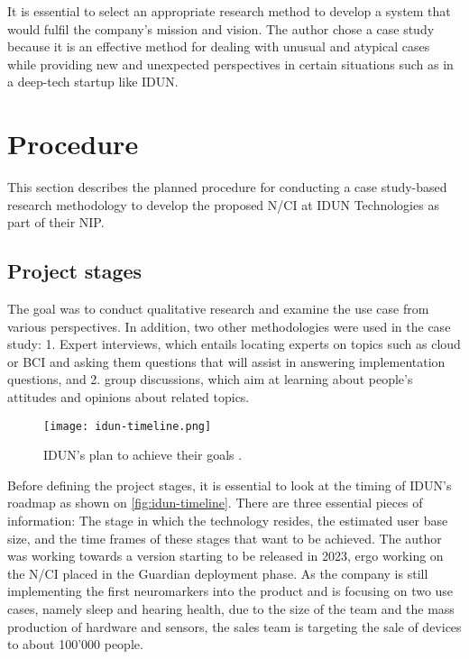 It is essential to select an appropriate research method to develop a system that would fulfil the company's mission and vision. The author chose a case study because it is an effective method for dealing with unusual and atypical cases while providing new and unexpected perspectives in certain situations such as in a deep-tech startup like IDUN.

\section{Procedure}
\label{chapter3-procedure}

This section describes the planned procedure for conducting a case study-based research methodology to develop the proposed N/CI at IDUN Technologies as part of their NIP.

\subsection{Project stages}
\label{chapter3-project-stages}

The goal was to conduct qualitative research and examine the use case from various perspectives. In addition, two other methodologies were used in the case study: 1. Expert interviews, which entails locating experts on topics such as cloud or BCI and asking them questions that will assist in answering implementation questions, and 2. group discussions, which aim at learning about people's attitudes and opinions about related topics.

\begin{figure}[!ht]
  \centering
  \texttt{[image: idun-timeline.png]}
  \caption[IDUN's plan to achieve their goals]{IDUN's plan to achieve their goals \citep{idun_guardian_nodate}.}
  \label{fig:idun-timeline}
\end{figure}

Before defining the project stages, it is essential to look at the timing of IDUN's roadmap as shown on \autoref{fig:idun-timeline}. There are three essential pieces of information: The stage in which the technology resides, the estimated user base size, and the time frames of these stages that want to be achieved. The author was working towards a version starting to be released in 2023, ergo working on the N/CI placed in the Guardian deployment phase. As the company is still implementing the first neuromarkers into the product and is focusing on two use cases, namely sleep and hearing health, due to the size of the team and the mass production of hardware and sensors, the sales team is targeting the sale of devices to about 100'000 people.

